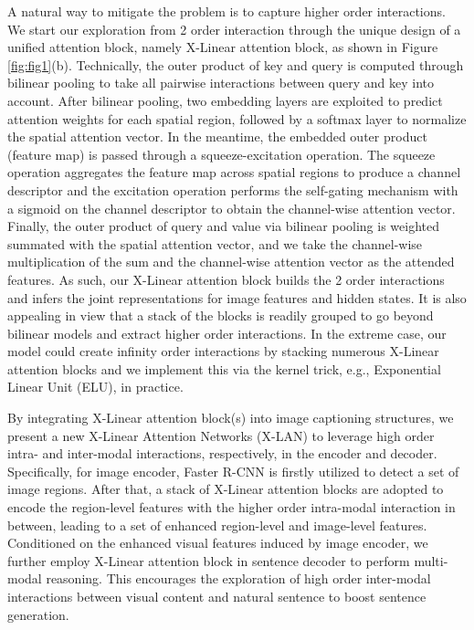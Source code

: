 \documentclass[10pt,twocolumn,letterpaper]{article}
\begin{document}
A natural way to mitigate the problem is to capture higher order interactions. We start our exploration from 2 order interaction through the unique design of a unified attention block, namely X-Linear attention block, as shown in Figure \ref{fig:fig1}(b). Technically, the outer product of key and query is computed through bilinear pooling to take all pairwise interactions between query and key into account. After bilinear pooling, two embedding layers are exploited to predict attention weights for each spatial region, followed by a softmax layer to normalize the spatial attention vector. In the meantime, the embedded outer product (feature map) is passed through a squeeze-excitation operation. The squeeze operation aggregates the feature map across spatial regions to produce a channel descriptor and the excitation operation performs the self-gating mechanism with a sigmoid on the channel descriptor to obtain the channel-wise attention vector. Finally, the outer product of query and value via bilinear pooling is weighted summated with the spatial attention vector, and we take the channel-wise multiplication of the sum and the channel-wise attention vector as the attended features. As such, our X-Linear attention block builds the 2 order interactions and infers the joint representations for image features and hidden states. It is also appealing in view that a stack of the blocks is readily grouped to go beyond bilinear models and extract higher order interactions. In the extreme case, our model could create infinity order interactions by stacking numerous X-Linear attention blocks and we implement this via the kernel trick, e.g., Exponential Linear Unit (ELU), in practice.

By integrating X-Linear attention block(s) into image captioning structures, we present a new X-Linear Attention Networks (X-LAN) to leverage high order intra- and inter-modal interactions, respectively, in the encoder and decoder. Specifically, for image encoder, Faster R-CNN is firstly utilized to detect a set of image regions. After that, a stack of X-Linear attention blocks are adopted to encode the region-level features with the higher order intra-modal interaction in between, leading to a set of enhanced region-level and image-level features. Conditioned on the enhanced visual features induced by image encoder, we further employ X-Linear attention block in sentence decoder to perform multi-modal reasoning. This encourages the exploration of high order inter-modal interactions between visual content and natural sentence to boost sentence generation.
\end{document}

